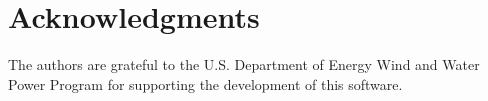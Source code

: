 \chapter*{Acknowledgments}
The authors are grateful to the U.S. Department of Energy Wind and Water Power Program for supporting the development of this software.